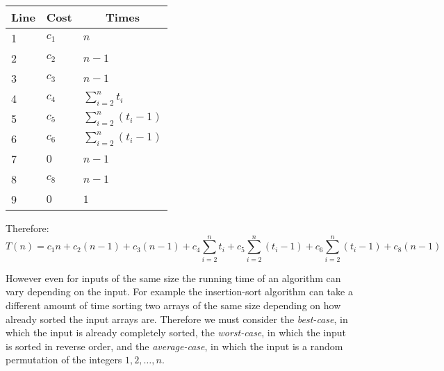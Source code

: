 \documentclass[12pt letter]{report}
\begin{document}
\begin{table}
  \begin{center}
    \begin{tabular}[c]{|l|l|l|}
      \hline
      \multicolumn{1}{|c|}{\textbf{Line}} &
      \multicolumn{1}{c|}{\textbf{Cost}}  &
      \multicolumn{1}{c|}{\textbf{Times}}                                                    \\
      \hline
      1                                   & $c_1$ & $n$                                      \\

      2                                   & $c_2$ & $n-1$                                    \\

      3                                   & $c_3$ & $n-1$                                    \\

      4                                   & $c_4$ & $\sum_{i=2}^{n} t_i$                     \\

      5                                   & $c_5$ & $\sum_{i=2}^{n} \left( t_i - 1 \right) $ \\

      6                                   & $c_6$ & $\sum_{i=2}^{n} \left( t_i - 1 \right) $ \\

      7                                   & $0$   & $n-1$                                    \\

      8                                   & $c_8$ & $n-1$                                    \\
      9                                   & $0$   & $1$                                      \\
      \hline
    \end{tabular}
  \end{center}
\end{table}

Therefore:
\[
  T \left( n \right)  = c_1 n + c_2  \left( n - 1 \right) + c_3 \left( n-1 \right) + c_4 \displaystyle\sum_{i=2}^{n} t_i +
  c_5 \displaystyle\sum_{i=2}^{n} \left( t_i -1 \right) + c_6 \displaystyle\sum_{i=2}^{n} \left( t_i -1 \right) + c_8 \left( n-1 \right)
\]

However even for inputs of the same size the running time of an algorithm can vary depending on the input. For example
the insertion-sort algorithm can take a different amount of time sorting two arrays of the same size depending on
how already sorted the input arrays are. Therefore we must consider the \textit{best-case}, in which the input is
already completely sorted, the \textit{worst-case}, in which the input is sorted in reverse order, and the \textit{average-case},
in which the input is a random permutation of the integers $1,2,\ldots,n$.
\end{document}
